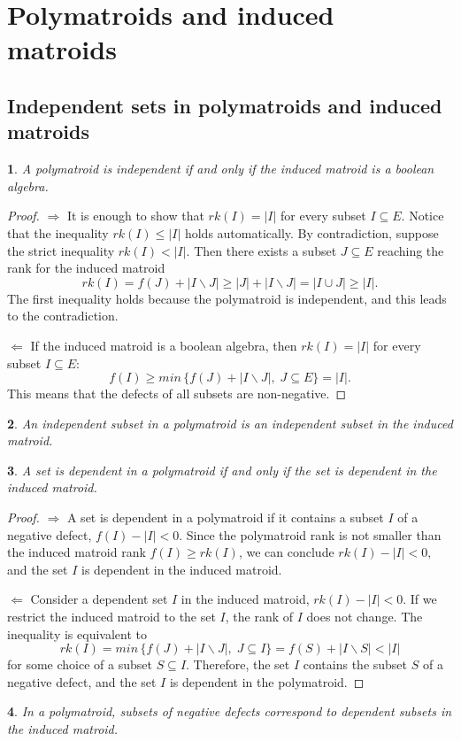 \documentclass[11pt]{article}
\theoremstyle{plain}
\newtheorem{thm}{\protect\theoremname}[section]
\theoremstyle{definition}
\theoremstyle{remark}
\theoremstyle{plain}
\theoremstyle{plain}
\newtheorem{prop}[thm]{\protect\propositionname}
\theoremstyle{plain}
\newtheorem{cor}[thm]{\protect\corollaryname}
\theoremstyle{definition}
\providecommand{\corollaryname}{Corollary}
\providecommand{\propositionname}{Proposition}
\providecommand{\theoremname}{Theorem}
\begin{document}
\section{Polymatroids and induced matroids}

\subsection{Independent sets in polymatroids and induced matroids}
\begin{thm}
\label{Theorem. Independent in polymatroid iff idependent in matroid}A
polymatroid is independent if and only if the induced matroid is a
boolean algebra.
\end{thm}

\begin{proof}
$\boxed{\Rightarrow}$ It is enough to show that $rk(I)=|I|$ for
every subset $I\subseteq E$. Notice that the inequality $rk(I)\leq|I|$
holds automatically. By contradiction, suppose the strict inequality
$rk(I)<|I|.$ Then there exists a subset $J\subseteq E$ reaching
the rank for the induced matroid
\[
rk(I)=f(J)+|I\backslash J|\geq|J|+|I\backslash J|=|I\cup J|\geq|I|.
\]
The first inequality holds because the polymatroid is independent,
and this leads to the contradiction.

$\boxed{\Leftarrow}$ If the induced matroid is a boolean algebra,
then $rk(I)=|I|$ for every subset $I\subseteq E$: 
\[
f(I)\geq min\,\{f(J)+|I\backslash J|,\;J\subseteq E\}=|I|.
\]
This means that the defects of all subsets are non-negative.
\end{proof}
\begin{cor}
An independent subset in a polymatroid is an independent subset in
the induced matroid.
\end{cor}

\begin{prop}
\label{Proposition. Dependent in polymatroid dependent in matroid}A
set is dependent in a polymatroid if and only if the set is dependent
in the induced matroid.
\end{prop}

\begin{proof}
$\boxed{\Rightarrow}$ A set is dependent in a polymatroid if it contains
a subset $I$ of a negative defect, $f(I)-|I|<0$. Since the polymatroid
rank is not smaller than the induced matroid rank $f(I)\geq rk(I)$,
we can conclude $rk(I)-|I|<0,$ and the set $I$ is dependent in the
induced matroid.

$\boxed{\Leftarrow}$ Consider a dependent set $I$ in the induced
matroid, $rk(I)-|I|<0$. If we restrict the induced matroid to the
set $I$, the rank of $I$ does not change. The inequality is equivalent
to 
\[
rk(I)=min\,\{f(J)+|I\backslash J|,\;J\subseteq I\}=f(S)+|I\backslash S|<|I|
\]
for some choice of a subset $S\subseteq I$. Therefore, the set $I$
contains the subset $S$ of a negative defect, and the set $I$ is
dependent in the polymatroid.
\end{proof}
\begin{cor}
In a polymatroid, subsets of negative defects correspond to dependent
subsets in the induced matroid.
\end{cor}
\end{document}
